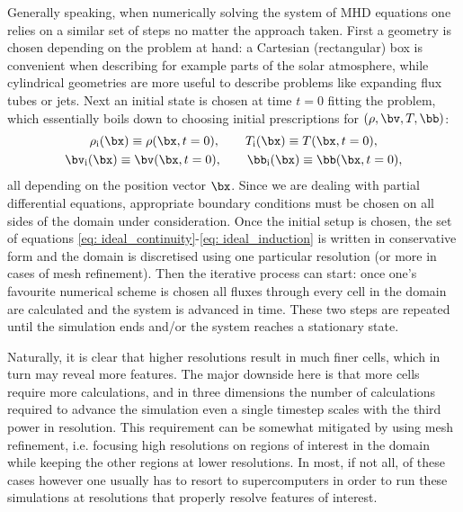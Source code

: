 Generally speaking, when numerically solving the system of MHD equations one relies on a similar set of steps no matter the approach taken. First a geometry is chosen depending on the problem at hand: a Cartesian (rectangular) box is convenient when describing for example parts of the solar atmosphere, while cylindrical geometries are more useful to describe problems like expanding flux tubes or jets. Next an initial state is chosen at time $t = 0$ fitting the problem, which essentially boils down to choosing initial prescriptions for $(\rho, \bv, T, \bb)$:
\begin{equation}
  \begin{gathered}
    \rho_\text{i}(\bx) \equiv \rho(\bx, t=0), \qquad T_\text{i}(\bx) \equiv T(\bx, t=0), \\
    \bv_\text{i}(\bx) \equiv \bv(\bx, t=0), \qquad \bb_\text{i}(\bx) \equiv \bb(\bx, t=0),
  \end{gathered}
\end{equation}
all depending on the position vector $\bx$. Since we are dealing with partial differential equations, appropriate boundary conditions must be chosen on all sides of the domain under consideration. Once the initial setup is chosen, the set of equations \eqref{eq: ideal_continuity}-\eqref{eq: ideal_induction} is written in conservative form and the domain is discretised using one particular resolution (or more in cases of mesh refinement). Then the iterative process can start: once one's favourite numerical scheme is chosen all fluxes through every cell in the domain are calculated and the system is advanced in time. These two steps are repeated until the simulation ends and/or the system reaches a stationary state.

Naturally, it is clear that higher resolutions result in much finer cells, which in turn may reveal more features. The major downside here is that more cells require more calculations, and in three dimensions the number of calculations required to advance the simulation even a single timestep scales with the third power in resolution. This requirement can be somewhat mitigated by using mesh refinement, i.e. focusing high resolutions on regions of interest in the domain while keeping the other regions at lower resolutions. In most, if not all, of these cases however one usually has to resort to supercomputers in order to run these simulations at resolutions that properly resolve features of interest.



